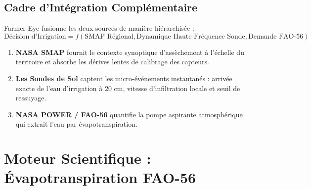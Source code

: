 \documentclass[11pt,a4paper,oneside]{report}
\begin{document}
\section{Cadre d'Intégration Complémentaire}
Farmer Eye fusionne les deux sources de manière hiérarchisée :
\begin{equation}
\text{Décision d'Irrigation} = f\left( \text{SMAP Régional}, \text{Dynamique Haute Fréquence Sonde}, \text{Demande FAO-56} \right)
\end{equation}
\begin{enumerate}
    \item \textbf{NASA SMAP} fournit le contexte synoptique d'assèchement à l'échelle du territoire et absorbe les dérives lentes de calibrage des capteurs.
    \item \textbf{Les Sondes de Sol} captent les micro-événements instantanés : arrivée exacte de l'eau d'irrigation à 20 cm, vitesse d'infiltration locale et seuil de ressuyage.
    \item \textbf{NASA POWER / FAO-56} quantifie la pompe aspirante atmosphérique qui extrait l'eau par évapotranspiration.
\end{enumerate}

\chapter{Moteur Scientifique : Évapotranspiration FAO-56}
\end{document}

